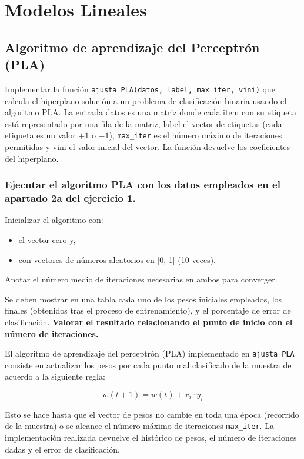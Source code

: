\chapter{Modelos Lineales}

\section{Algoritmo de aprendizaje del Perceptrón (PLA)}

Implementar la función 
\texttt{ajusta_PLA(datos, label, max_iter, vini)} 
que calcula el  hiperplano solución a un problema de clasificación binaria
usando el algoritmo PLA. La entrada datos es una matriz donde cada item con su
etiqueta está representado por una fila de la matriz, label el vector de
etiquetas (cada etiqueta es un valor $+1$ o $-1$), \texttt{max_iter}
es el número máximo de iteraciones permitidas y vini el valor inicial del vector.
La función devuelve los coeficientes del hiperplano.

\subsection{Ejecutar el algoritmo PLA con los datos empleados en el apartado 2a del
ejercicio 1.}

Inicializar el algoritmo con: 

\begin{itemize}
\item el vector cero y, 
\item con vectores de números aleatorios en [0, 1] (10 veces).
\end{itemize}

Anotar el número medio de iteraciones necesarias en ambos para converger.

Se deben mostrar en una tabla cada uno de los pesos iniciales empleados, los
finales (obtenidos tras el proceso de entrenamiento), y el porcentaje de error
de clasificación. \textbf{Valorar el resultado relacionando el punto de inicio con el
número de iteraciones.}

\hfill \break

El algoritmo de aprendizaje del perceptrón (PLA) implementado en
\texttt{ajusta_PLA} consiste en actualizar los pesos por cada punto
mal clasificado de la muestra de acuerdo a la siguiente regla:

$$
w(t+1) = w(t) + x_i \cdot y_i
$$

Esto se hace hasta que el vector de pesos no cambie en toda una época (recorrido
de la muestra) o se alcance el número máximo de iteraciones \texttt{max_iter}.
La implementación realizada devuelve el histórico de pesos, el número de
iteraciones dadas y el error de clasificación.

